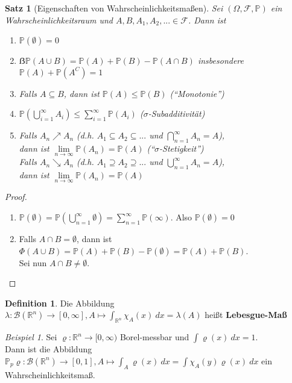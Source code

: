\documentclass[10pt,a4paper]{article}
\newcommand{\R}{\ensuremath{\mathbb{R}}}
\newcommand{\la}{\ensuremath{\lambda}}
\newcommand{\Bor}{\mathscr B}
\newcommand{\Prb}{\mathbb P}
\newcommand{\scF}{\ensuremath{\mathscr{F}}}
\theoremstyle{plain}
\newtheorem{satz}[theorem]{Satz}
\theoremstyle{definition}
\newtheorem{definition}[theorem]{Definition}
\theoremstyle{remark}
\newtheorem{exm}[theorem]{Beispiel}
\begin{document}
	\begin{satz}[Eigenschaften von Wahrscheinlichkeitsmaßen]
	Sei $(\Omega,\scF,\Prb)$ ein Wahrscheinlichkeitsraum und $A,B,A_1,A_2,...\in\scF$. Dann ist
	\begin{enumerate}[label=\alph*)]
		\item $\Prb(\emptyset)=0$
		\item $ẞ\Prb(A\cup B)=\Prb(A)+\Prb(B)-\Prb(A\cap B)$
		\subitem insbesondere $\Prb(A)+\Prb(A^C)=1$
		\item Falls $A\subseteq B$, dann ist $\Prb(A)\le\Prb(B)$ (\enquote{Monotonie})
		\item $\Prb\left(\bigcup_{i=1}^\infty A_i\right)\leq \sum_{i=1}^\infty \Prb(A_i)$ ($\sigma$-Subadditivität)
		\item Falls $A_n \nearrow A_n$ (d.h. $A_1\subseteq A_2\subseteq...$ und $\bigcap_{n=1}^\infty A_n=A$), \\
		dann ist $\lim\limits_{n\to\infty}\Prb(A_n)=\Prb(A)$ (\enquote{$\sigma$-Stetigkeit})\\
		Falls $A_n \searrow A_n$ (d.h. $A_1\supseteq A_2\supseteq...$ und $\bigcup_{n=1}^\infty A_n=A$), \\
		dann ist $\lim\limits_{n\to\infty}\Prb(A_n)=\Prb(A)$
	\end{enumerate}
	\end{satz}
	\begin{proof}
		\begin{enumerate}[label=\alph*)]
			\item $\Prb(\emptyset)=\Prb\left(\bigcup_{n=1}^\infty \emptyset\right)=\sum_{n=1}^{\infty}\Prb(\infty)$. Also $\Prb(\emptyset)=0$
			\item Falls $A\cap B=\emptyset$, dann ist $\Phi(A\cup B)=\Prb(A)+\Prb(B)-\Prb(\emptyset)=\Prb(A)+\Prb(B)$.\\
			Sei nun $A\cap B\neq\emptyset$. 
		\end{enumerate}
	\end{proof}


\setcounter{theorem}{26}

	\begin{definition}
		Die Abbildung $\la:\Bor(\R^n)\to[0,\infty], A\mapsto\int_{\R^n}\chi_A(x)~dx=\la(A)$ heißt \textbf{Lebesgue-Maß}
	\end{definition}
	
	\begin{exm}\label{0128exm}
			Sei $\varrho:\R^n\to[0,\infty)$ Borel-messbar und $\int\varrho(x)~dx=1$.\\
			Dann ist die Abbildung $\Prb_p\varrho:\Bor(\R^n)\to[0,1],A\mapsto\int_A\varrho(x)~dx=\int\chi_A(y)\varrho(x)~dx$ ein Wahrscheinlichkeitsmaß.
	\end{exm}
\end{document}
